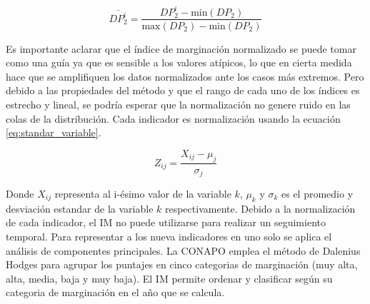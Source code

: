 \begin{equation}
    \bar{DP_2^i} = \frac{DP_2^i-\text{min}(DP_2)}{\text{max}(DP_2)-\text{min}(DP_2)}
    \label{eq:dp2_normalization}
\end{equation}

Es importante aclarar que el índice de marginación normalizado se puede tomar como una guía ya que es sensible a los valores atípicos, lo que en cierta medida hace que se amplifiquen los datos normalizados ante los casos más extremos. Pero debido a las propiedades del método y que el rango de cada uno de los índices es estrecho y lineal, se podría esperar que la normalización no genere ruido en las colas de la distribución. Cada indicador es normalización usando la ecuación \ref{eq:standar_variable}.

\begin{equation}
    Z_{ij} = \frac{X_{ij}-\mu_j}{\sigma_j} \label{eq:standar_variable}
\end{equation}

Donde $X_{ij}$ representa al i-ésimo valor de la variable $k$, $\mu_k$ y $\sigma_k$ es el promedio y desviación estandar de la variable $k$ respectivamente. Debido a la normalización de cada indicador, el IM no puede utilizarse para realizar un seguimiento temporal. Para representar a los nueva indicadores en uno solo se aplica el análisis de componentes principales. La CONAPO emplea el método de Dalenius Hodges\cite{Dalenius_1959} para agrupar los puntajes en cinco categorias de marginación (muy alta, alta, media, baja y muy baja). El IM permite ordenar y clasificar según su categoria de marginación en el año que se calcula.

